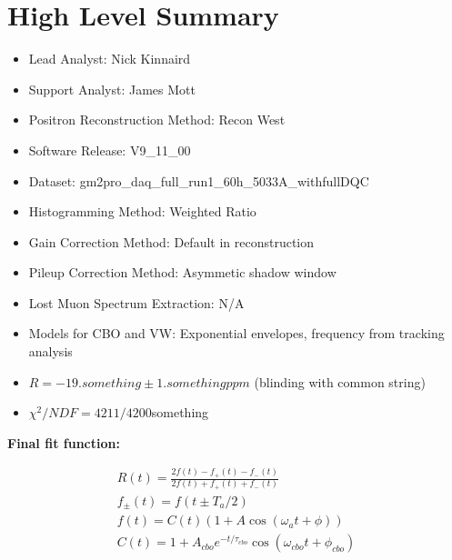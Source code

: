 \chapter*{High Level Summary}

\begin{itemize}
	\item{Lead Analyst: Nick Kinnaird}
	\item{Support Analyst: James Mott}
	\item{Positron Reconstruction Method: Recon West}
	\item{Software Release: V9\_11\_00}
	\item{Dataset: gm2pro\_daq\_full\_run1\_60h\_5033A\_withfullDQC}
	\item{Histogramming Method: Weighted Ratio}
	\item{Gain Correction Method: Default in reconstruction}
	\item{Pileup Correction Method: Asymmetic shadow window}
	\item{Lost Muon Spectrum Extraction: N/A}
	\item{Models for CBO and VW: Exponential envelopes, frequency from tracking analysis}
	\item{$R = -19.something \pm 1.something ppm$ (blinding with common string)}
	\item{$\chi^{2}/NDF = 4211/4200$something}
\end{itemize}

\bf{Final fit function:}

\begin{gather*}
		R(t) = \frac{2f(t) - f_{+}(t) - f_{-}(t)}{2f(t) + f_{+}(t) + f_{-}(t)} \\
		f_{\pm}(t) = f(t \pm T_{a}/2) \\
		f(t) = C(t) (1 + A \cos(\omega_{a}t + \phi)) \\ 
		C(t) = 1 + A_{cbo} e^{-t/\tau_{cbo}} \cos(\omega_{cbo}t + \phi_{cbo})
\end{gather*}
